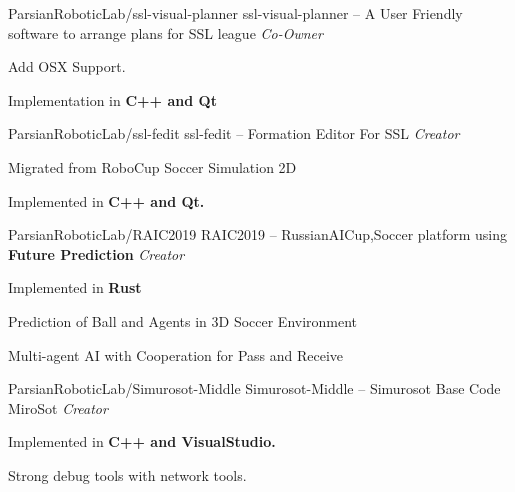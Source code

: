 
\begin{cventries}
  \cventry
    {ParsianRoboticLab/ssl-visual-planner} %
    {ssl-visual-planner -- A User Friendly software to arrange plans for SSL league} %
    {\textit{Co-Owner}} %
    {} %
    {
      \begin{cvitems} %
        \item {Add OSX Support.}
        \item {Implementation in \textbf{C++ and Qt}}
      \end{cvitems}
    }

  \cventry
    {ParsianRoboticLab/ssl-fedit} %
    {ssl-fedit -- Formation Editor For SSL} %
    {\textit{Creator}} %
    {} %
    {
      \begin{cvitems} %
        \item {Migrated from RoboCup Soccer Simulation 2D}
        \item {Implemented in \textbf{C++ and Qt.}}
      \end{cvitems}
    }

  \cventry
    {ParsianRoboticLab/RAIC2019} %
    {RAIC2019 -- RussianAICup,Soccer platform using \textbf{Future Prediction}} %
    {\textit{Creator}} %
    {} %
    {
      \begin{cvitems} %
        \item {Implemented in \textbf{Rust}}
        \item {Prediction of Ball and Agents in 3D Soccer Environment}
        \item {Multi-agent AI with Cooperation for Pass and Receive}
      \end{cvitems}
    }

  \cventry
    {ParsianRoboticLab/Simurosot-Middle} %
    {Simurosot-Middle -- Simurosot Base Code MiroSot} %
    {\textit{Creator}} %
    {} %
    {
      \begin{cvitems} %
        \item {Implemented in \textbf{C++ and VisualStudio.}}
        \item {Strong debug tools with network tools.}
      \end{cvitems}
    }
    

\end{cventries}
